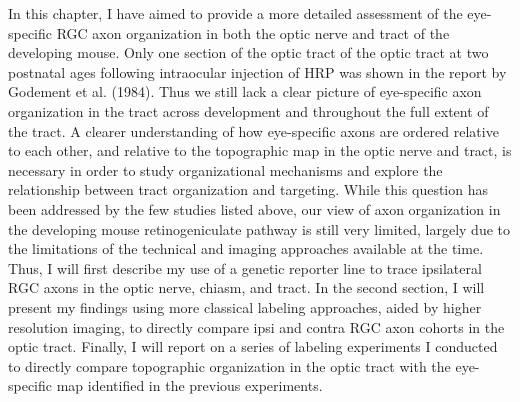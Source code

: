 In this chapter, I have aimed to provide a more detailed assessment of the eye-specific RGC axon organization in both the optic nerve and tract of the developing mouse.
Only one section of the optic tract of the optic tract at two postnatal ages following intraocular injection of HRP was shown in the report by Godement et al. (1984).
Thus we still lack a clear picture of eye-specific axon organization in the tract across development and throughout the full extent of the tract.
A clearer understanding of how eye-specific axons are ordered relative to each other, and relative to the topographic map in the optic nerve and tract, is necessary in order to study organizational mechanisms and explore the relationship between tract organization and targeting.
While this question has been addressed by the few studies listed above, our view of axon organization in the developing mouse retinogeniculate pathway is still very limited, largely due to the limitations of the technical and imaging approaches available at the time.
Thus, I will first describe my use of a genetic reporter line to trace ipsilateral RGC axons in the optic nerve, chiasm, and tract.
In the second section, I will present my findings using more classical labeling approaches, aided by higher resolution imaging, to directly compare ipsi and contra RGC axon cohorts in the optic tract.
Finally, I will report on a series of labeling experiments I conducted to directly compare topographic organization in the optic tract with the eye-specific map identified in the previous experiments.